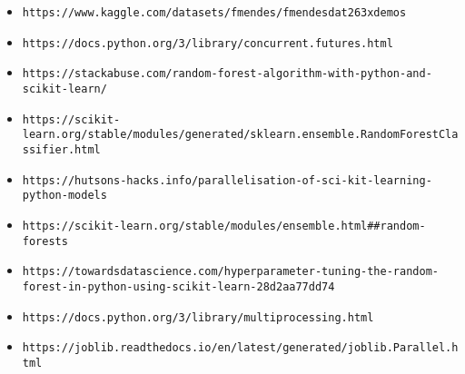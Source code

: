 \documentclass{article}
\begin{document}
\begin{itemize}
\item \texttt{\nolinkurl{https://www.kaggle.com/datasets/fmendes/fmendesdat263xdemos}}
\item \texttt{\nolinkurl{https://docs.python.org/3/library/concurrent.futures.html}}
\item \texttt{\nolinkurl{https://stackabuse.com/random-forest-algorithm-with-python-and-scikit-learn/}}
\item \texttt{\nolinkurl{https://scikit-learn.org/stable/modules/generated/sklearn.ensemble.RandomForestClassifier.html}}
\item \texttt{\nolinkurl{https://hutsons-hacks.info/parallelisation-of-sci-kit-learning-python-models}}
\item \texttt{\nolinkurl{https://scikit-learn.org/stable/modules/ensemble.html##random-forests}}
\item \texttt{\nolinkurl{https://towardsdatascience.com/hyperparameter-tuning-the-random-forest-in-python-using-scikit-learn-28d2aa77dd74}}
\item \texttt{\nolinkurl{https://docs.python.org/3/library/multiprocessing.html}}
\item \texttt{\nolinkurl{https://joblib.readthedocs.io/en/latest/generated/joblib.Parallel.html}}
\end{itemize}
\end{document}
